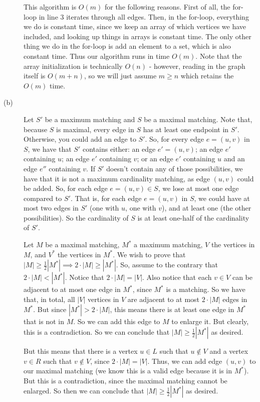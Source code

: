 \documentclass{article}
\begin{document}
\begin{description}
        This algorithm is $O(m)$ for the following reasons. First of all, the
        for-loop in line 3 iterates through all edges. Then, in
        the for-loop, everything we do is constant time, since we keep an array
        of which vertices we have included, and looking up things in arrays is
        constant time. The only other thing we do in the for-loop is add an
        element to a set, which is also constant time. Thus our algorithm runs
        in time $O(m)$. Note that the array initialization is technically $O(n)$
        - however, reading in the graph itself is $O(m+n)$, so we will just
        assume $m \geq n$ which retains the $O(m)$ time.
    \item[(b)]
        Let $S'$ be a maximum matching and $S$ be a maximal matching.
        Note that, because $S$ is maximal, every edge in $S$ has at least one
        endpoint in $S'$. Otherwise, you could add an edge to $S'$.
        So, for every edge $e = (u,v)$ in $S$, we have that $S'$ contains either: an
        edge $e' = (u,v)$; an edge $e'$ containing $u$; an edge $e'$ containing
        $v$; or an edge $e'$ containing $u$ and an edge $e''$ containing $v$. If
        $S'$ doesn't contain any of those possibilities, we have that it is not
        a maximum cardinality matching, as edge $(u,v)$ could be added.
        So, for each edge $e = (u,v) \in S$,
        we lose at most one edge compared to $S'$. That is, for each edge
        $e = (u,v)$ in $S$, we could have at most two edges in $S'$ (one with
        $u$, one with $v$), and at least one (the other possibilities).
        So the cardinality of $S$ is at least
        one-half of the cardinality of $S'$.

        Let $M$ be a maximal matching, $M^*$ a maximum matching, $V$ the
        vertices in $M$, and $V^*$ the vertices in $M^*$.
        We wish to prove that $|M| \geq \frac{1}{2} |M^*|
        \implies 2 \cdot |M| \geq |M^*|$. So, assume to the contrary that $2
        \cdot |M| < |M^*|$. Notice that $2 \cdot |M| = |V|$. Also
        notice that each $v \in V$ can be adjacent to at most one edge in $M^*$,
        since $M^*$ is a matching.
        So we have that, in total, all $|V|$ vertices in $V$ are adjacent to at most $2 \cdot |M|$
        edges in $M^*$. But since $|M^*| > 2 \cdot |M|$, this means there is
        at least one edge in
        $M^*$ that is not in $M$. So we can add this edge to $M$ to enlarge it.
        But clearly, this is a contradiction. So we can conclude that $|M| \geq
        \frac{1}{2} |M^*|$ as desired.


        But this means that there is a vertex
        $u \in L$ such that $u \notin V$ and a vertex $v \in R$ such that $v
        \notin V$, since $2 \cdot |M| = |V|$. Thus, we can add edge $(u,v)$ to
        our maximal matching (we know this is a valid edge because it is in
        $M^*$). But this is a contradiction, since the maximal
        matching cannot be enlarged. So then we can conclude that $|M| \geq
        \frac{1}{2} |M^*|$ as desired.
\end{description}
\newpage
\end{document}

